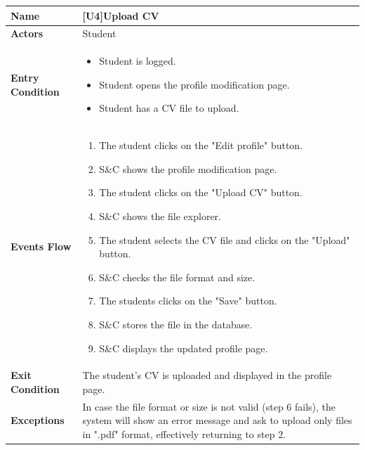 \begin{center}
    \begin{tabular}{|p{9em}|p{27em}|}
        \hline
        \rowcolor{bluepoli!40} %
        \textbf{Name} & \textbf{[U4]Upload CV} \\
        \hline
        \textbf{Actors} & Student \\
        \hline
        \textbf{Entry Condition} & 
        \begin{itemize}
            \item Student is logged.
            \item Student opens the profile modification page.
            \item Student has a CV file to upload.
        \end{itemize} \\
        \hline
        \textbf{Events Flow} & 
        \begin{enumerate}
            \item The student clicks on the "Edit profile" button.
            \item S\&C shows the profile modification page.
            \item The student clicks on the "Upload CV" button.
            \item S\&C shows the file explorer.
            \item The student selects the CV file and clicks on the "Upload" button.
            \item S\&C checks the file format and size.
            \item The students clicks on the "Save" button.
            \item S\&C stores the file in the database.
            \item S\&C displays the updated profile page.
        \end{enumerate} \\
        \hline
        \textbf{Exit Condition} & The student's CV is uploaded and displayed in the profile page. \\
        \hline
        \textbf{Exceptions} & In case the file format or size is not valid (step 6 fails), the system will show an error message and ask 
        to upload only files in ".pdf" format, effectively returning to step 2. \\
        \hline
    \end{tabular}
\end{center}

